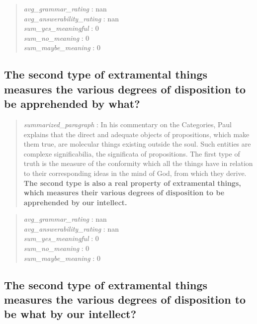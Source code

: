 \begin{quote}
\emph{avg\_grammar\_rating} : nan\\
\emph{avg\_answerability\_rating} : nan\\
\emph{sum\_yes\_meaningful} : 0\\
\emph{sum\_no\_meaning} : 0\\
\emph{sum\_maybe\_meaning} : 0
\end{quote}

\hypertarget{the-second-type-of-extramental-things-measures-the-various-degrees-of-disposition-to-be-apprehended-by-what}{%
\subsection{The second type of extramental things measures the various
degrees of disposition to be apprehended by
what?}\label{the-second-type-of-extramental-things-measures-the-various-degrees-of-disposition-to-be-apprehended-by-what}}

\begin{quote}
\emph{summarized\_paragraph} : In his commentary on the Categories, Paul
explains that the direct and adequate objects of propositions, which
make them true, are molecular things existing outside the soul. Such
entities are complexe significabilia, the significata of propositions.
The first type of truth is the measure of the conformity which all the
things have in relation to their corresponding ideas in the mind of God,
from which they derive. \textbf{The second type is also a real property
of extramental things, which measures their various degrees of
disposition to be apprehended by our intellect.}
\end{quote}

\begin{quote}
\emph{avg\_grammar\_rating} : nan\\
\emph{avg\_answerability\_rating} : nan\\
\emph{sum\_yes\_meaningful} : 0\\
\emph{sum\_no\_meaning} : 0\\
\emph{sum\_maybe\_meaning} : 0
\end{quote}

\hypertarget{the-second-type-of-extramental-things-measures-the-various-degrees-of-disposition-to-be-what-by-our-intellect}{%
\subsection{The second type of extramental things measures the various
degrees of disposition to be what by our
intellect?}\label{the-second-type-of-extramental-things-measures-the-various-degrees-of-disposition-to-be-what-by-our-intellect}}

